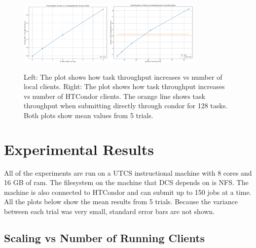 \documentclass{article}
\begin{document}
\begin{figure}[t]
  \begin{center}
    \includegraphics[width=0.4\textwidth]{client_scaling_local.png}
    \includegraphics[width=0.4\textwidth]{client_scaling_condor.png}
    \caption{Left: The plot shows how task throughput increases vs number of local clients. Right: The plot shows how task throughput increases vs number of HTCondor clients. The orange line shows task throughput when submitting directly through condor for 128 tasks. Both plots show mean values from 5 trials.}
    \label{fg:client_scaling}
  \end{center}
\end{figure}

\section{Experimental Results}

All of the experiments are run on a UTCS instructional machine with 8 cores and 16 GB of ram. The filesystem on the machine that DCS depends on is NFS. The machine is also connected to HTCondor and can submit up to 150 jobs at a time. All the plots below show the mean results from 5 trials. Because the variance between each trial was very small, standard error bars are not shown.

\subsection{Scaling vs Number of Running Clients}
\end{document}
